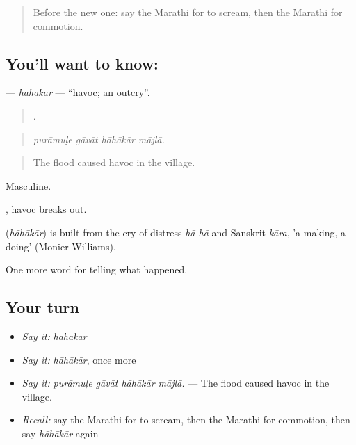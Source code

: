 \label{lesson:MR-C298-hahakar}



\begin{quote}
Before the new one: say the Marathi for to scream, then the Marathi for commotion.
\end{quote}

\subsection*{You'll want to know: }
\textbf{} — \emph{hāhākār} — \textquotedblleft{}havoc; an outcry\textquotedblright{}.

\begin{quote}
   .
\end{quote}

\begin{quote}
\emph{purāmuḷe gāvāt hāhākār mājlā.}
\end{quote}

\begin{quote}
The flood caused havoc in the village.
\end{quote}

Masculine.

 , havoc breaks out.

\begin{cousinweb}
\textbf{} (\emph{hāhākār}) is built from the cry of distress \emph{hā hā} and Sanskrit \emph{kāra}, 'a making, a doing' (Monier-Williams).
\end{cousinweb}

\begin{grammarlens}[title={What you've built}]
One more word for telling what happened.
\end{grammarlens}

\subsection*{Your turn}
\begin{itemize}
\raggedright
  \item \emph{Say it:} \emph{hāhākār}
  \item \emph{Say it:} \emph{hāhākār}, once more
  \item \emph{Say it:} \emph{purāmuḷe gāvāt hāhākār mājlā.} — The flood caused havoc in the village.
  \item \emph{Recall:} say the Marathi for to scream, then the Marathi for commotion, then say \emph{hāhākār} again
\end{itemize}

